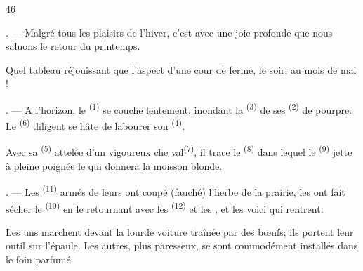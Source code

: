 \begin{VUpage}[48]{46}
\VUsaut{5.4mm}
\VUsaut{3.0mm}

\VUsaut{4.0mm}

. --- Malgré tous les plaisirs de l'hiver, c'est avec\nl
une joie profonde que nous saluons le retour du\nl
printemps.

Quel tableau réjouissant que l'aspect d'une cour de\nl
ferme, le soir, au mois de mai !

. --- A l'horizon, le \textsuperscript{(1)} se couche lentement,\nl
inondant la \textsuperscript{(3)} de ses \textsuperscript{(2)} de\nl
pourpre. Le \textsuperscript{(6)} diligent se hâte de labourer\nl
son \textsuperscript{(4)}.

\VUblancAlinea
Avec sa \textsuperscript{(5)} attelée d'un vigoureux che\cc
val\textsuperscript{(7)}, il trace le \textsuperscript{(8)} dans lequel le \textsuperscript{(9)}\nl
jette à pleine poignée le  qui donnera la moisson\nl
blonde.

. --- Les \textsuperscript{(11)} armés de leurs  ont\nl
coupé (fauché) l'herbe de la prairie, les  ont\nl
fait sécher le \textsuperscript{(10)} en le retournant avec les\nl
{}\textsuperscript{(12)} et les , et les voici qui rentrent.

\VUblancAlinea
Les uns marchent devant la lourde voiture traînée\nl
par des bœufs; ils portent leur outil sur l'épaule. Les\nl
autres, plus paresseux, se sont commodément installés\nl
dans le foin parfumé.
\end{VUpage}

